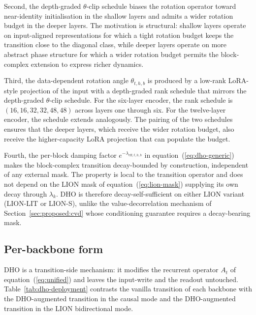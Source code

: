 Second, the depth-graded $\theta$-clip schedule biases the rotation
operator toward near-identity initialisation in the shallow layers
and admits a wider rotation budget in the deeper layers. The
motivation is structural: shallow layers operate on input-aligned
representations for which a tight rotation budget keeps the
transition close to the diagonal class, while deeper layers operate
on more abstract phase structure for which a wider rotation budget
permits the block-complex extension to express richer dynamics.

Third, the data-dependent rotation angle $\theta_{t, h, b}$ is
produced by a low-rank LoRA-style projection of the input with a
depth-graded rank schedule that mirrors the depth-graded
$\theta$-clip schedule. For the six-layer encoder, the rank schedule
is $(16, 16, 32, 32, 48, 48)$ across layers one through six. For the
twelve-layer encoder, the schedule extends analogously. The pairing
of the two schedules ensures that the deeper layers, which receive
the wider rotation budget, also receive the higher-capacity LoRA
projection that can populate the budget.

Fourth, the per-block damping factor
$e^{-\lambda_{\mathrm{eff}, t, h, b}}$ in
equation~(\ref{eq:dho-generic}) makes the block-complex transition
decay-bounded by construction, independent of any external mask.
The property is local to the transition operator and does not
depend on the LION mask of equation~(\ref{eq:lion-mask}) supplying
its own decay through $\lambda_{k}$. DHO is therefore
decay-self-sufficient on either LION variant (LION-LIT or LION-S),
unlike the value-decorrelation mechanism of
Section~\ref{sec:proposed:cvd} whose conditioning guarantee
requires a decay-bearing mask.

\subsection{Per-backbone form}

DHO is a transition-side mechanism: it modifies the recurrent
operator $A_{t}$ of equation~(\ref{eq:unified}) and leaves the
input-write and the readout untouched.
Table~\ref{tab:dho-deployment} contrasts the vanilla transition of
each backbone with the DHO-augmented transition in the causal mode
and the DHO-augmented transition in the LION bidirectional mode.

